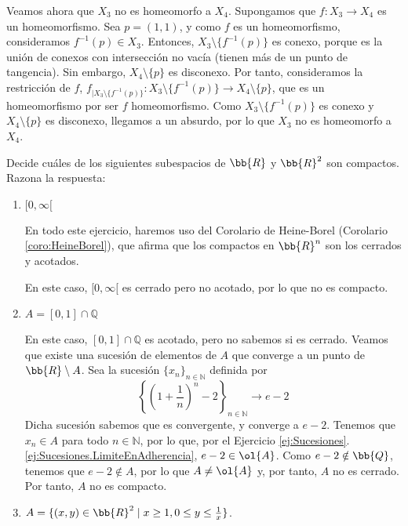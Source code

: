 \begin{ejercicio}
    Veamos ahora que $X_3$ no es homeomorfo a $X_4$. Supongamos que $f:X_3\to X_4$ es un homeomorfismo.
    Sea $p=(1,1)$, y como $f$ es un homeomorfismo, consideramos $f^{-1}(p)\in X_3$. Entonces, $X_3\setminus \{f^{-1}(p)\}$ es conexo,
    porque es la unión de conexos con intersección no vacía (tienen más de un punto de tangencia). Sin embargo, $X_4\setminus \{p\}$ es disconexo.
    Por tanto, consideramos la restricción de $f$, ${f}_{\big| X_3\setminus \{f^{-1}(p)\}}: X_3\setminus \{f^{-1}(p)\} \to X_4\setminus \{p\}$, que es un homeomorfismo por ser $f$ homeomorfismo.
    Como $X_3\setminus \{f^{-1}(p)\}$ es conexo y $X_4\setminus \{p\}$ es disconexo, llegamos a un absurdo, por lo que $X_3$ no es homeomorfo a $X_4$.
\end{ejercicio}

\begin{ejercicio}
Decide cuáles de los siguientes subespacios de $ \bb{R} $ y $ \bb{R}^2 $ son compactos. Razona la respuesta:
\begin{enumerate}
    \item $[0, \infty[$
    
    En todo este ejercicio, haremos uso del Corolario de Heine-Borel (Corolario \ref{coro:HeineBorel}), que afirma que los 
    compactos en $\bb{R}^n$ son los cerrados y acotados.

    En este caso, $[0,\infty[$ es cerrado pero no acotado, por lo que no es compacto.

    \item $A=[0, 1] \cap \mathbb{Q}$
    
    En este caso, $[0,1]\cap \mathbb{Q}$ es acotado, pero no sabemos si es cerrado. Veamos que existe una sucesión
    de elementos de $A$ que converge a un punto de $\bb{R}\setminus A$. Sea la sucesión $\{x_n\}_{n\in \mathbb{N}}$ definida por
    \begin{equation*}
        \left\{ \left( 1 + \frac{1}{n} \right)^n -2 \right\}_{n\in \mathbb{N}} \longrightarrow e-2
    \end{equation*}
    Dicha sucesión sabemos que es convergente, y converge a $e-2$.
    Tenemos que $x_n\in A$ para todo $n\in \mathbb{N}$, por lo que, por el Ejercicio \ref{ej:Sucesiones}.\ref{ej:Sucesiones.LimiteEnAdherencia},
    $e-2\in \ol{A}$. Como $e-2\notin \bb{Q}$, tenemos que $e-2\notin A$, por lo que $A\neq \ol{A}$ y, por tanto,
    $A$ no es cerrado. Por tanto, $A$ no es compacto.

    \item $A=\{(x, y) \in \bb{R}^2 \mid x \geq 1, 0 \leq y \leq \frac{1}{x}\}$.
    

\end{enumerate}
\end{ejercicio}
